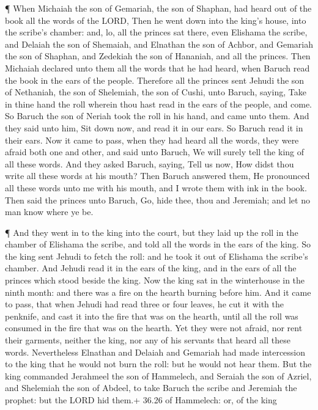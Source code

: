  ¶ When Michaiah the son of Gemariah, the son of Shaphan,
had heard out of the book all the words of the LORD,  Then
he went down into the king's house, into the scribe's chamber: and, lo,
all the princes sat there, even Elishama the scribe, and Delaiah the son
of Shemaiah, and Elnathan the son of Achbor, and Gemariah the son of
Shaphan, and Zedekiah the son of Hananiah, and all the princes.
 Then Michaiah declared unto them all the words that he had
heard, when Baruch read the book in the ears of the people.
 Therefore all the princes sent Jehudi the son of
Nethaniah, the son of Shelemiah, the son of Cushi, unto Baruch, saying,
Take in thine hand the roll wherein thou hast read in the ears of the
people, and come. So Baruch the son of Neriah took the roll in his hand,
and came unto them.  And they said unto him, Sit down now,
and read it in our ears. So Baruch read it in their ears. 
Now it came to pass, when they had heard all the words, they were afraid
both one and other, and said unto Baruch, We will surely tell the king
of all these words.  And they asked Baruch, saying, Tell us
now, How didst thou write all these words at his mouth? 
Then Baruch answered them, He pronounced all these words unto me with
his mouth, and I wrote them with ink in the book.  Then
said the princes unto Baruch, Go, hide thee, thou and Jeremiah; and let
no man know where ye be.

 ¶ And they went in to the king into the court, but they
laid up the roll in the chamber of Elishama the scribe, and told all the
words in the ears of the king.  So the king sent Jehudi to
fetch the roll: and he took it out of Elishama the scribe's chamber. And
Jehudi read it in the ears of the king, and in the ears of all the
princes which stood beside the king.  Now the king sat in
the winterhouse in the ninth month: and there was a fire on the hearth
burning before him.  And it came to pass, that when Jehudi
had read three or four leaves, he cut it with the penknife, and cast it
into the fire that was on the hearth, until all the roll was consumed in
the fire that was on the hearth.  Yet they were not afraid,
nor rent their garments, neither the king, nor any of his servants that
heard all these words.  Nevertheless Elnathan and Delaiah
and Gemariah had made intercession to the king that he would not burn
the roll: but he would not hear them.  But the king
commanded Jerahmeel the son of Hammelech, and Seraiah the son of Azriel,
and Shelemiah the son of Abdeel, to take Baruch the scribe and Jeremiah
the prophet: but the LORD hid them.+ 36.26 of Hammelech: or, of the king

